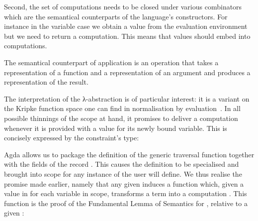 \begin{agdasnippet}
\addtolength{\leftskip}{\parindent}
\end{agdasnippet}
Second, the set of computations needs to be closed under various
combinators which are the semantical counterparts of the language's
constructors.
For instance in the variable case we obtain a value from the evaluation
environment but we need to return a computation. This means that values
should embed into computations.

\begin{agdasnippet}
\addtolength{\leftskip}{\parindent}
\end{agdasnippet}
The semantical counterpart of application is an operation that takes a
representation of a function and a representation of an argument and
produces a representation of the result.

\begin{agdasnippet}
\addtolength{\leftskip}{\parindent}
\end{agdasnippet}
The interpretation of the λ-abstraction is of particular interest:
it is a variant on the Kripke function space one can find in normalisation
by evaluation~\cite{berger1991inverse,berger1993program,CoqDybSK,coquand2002formalised}.
In all possible thinnings of the scope at hand, it promises
to deliver a computation whenever it is provided with a value for its newly
bound variable. This is concisely expressed by the constraint's type:

\begin{agdasnippet}
\addtolength{\leftskip}{\parindent}
\end{agdasnippet}


Agda allows us to package the definition of the generic traversal function
\semfun{} together with the fields of the record \semrec{}. This causes the
definition to be specialised and brought into scope for any instance of
\semrec{} the user will define.
We thus realise the promise made earlier, namely that any given
{\semrec{}  } induces
a function which, given a value in  for each variable in scope,
transforms a   term into a computation . This function is the proof of the Fundamental Lemma of Semantics for , relative to a given \semrec{}  :

